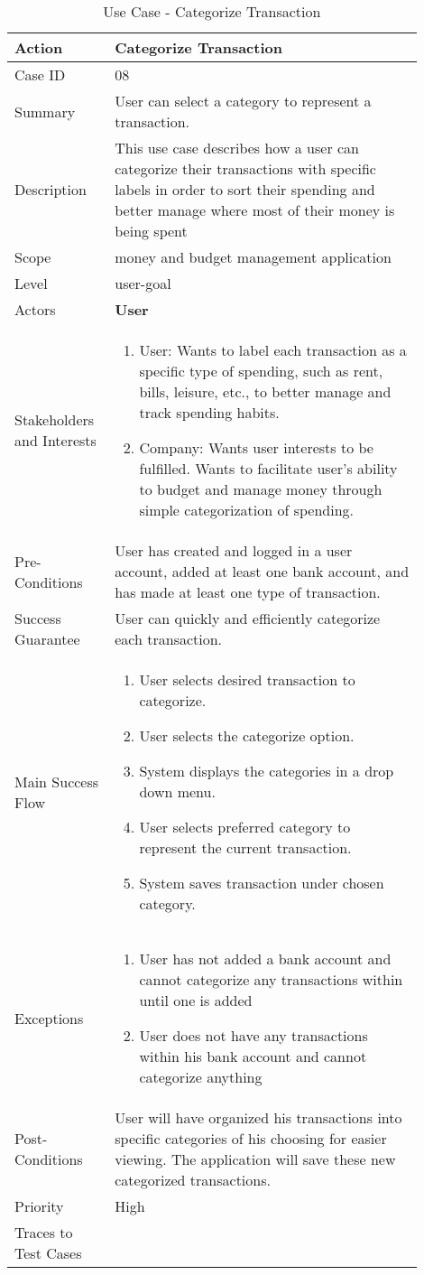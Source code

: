 \documentclass[11pt]{article}
\newcounter{use case ID}
\newcommand\tabularhead[1]{
    \begin{table}[ht]
        \addtocounter{use case ID}{1}
        \caption{Use Case \arabic{use case ID} - #1}
        \vspace{0.2cm}
        \begin{tabular}{|p{0.2\linewidth}|p{0.70\linewidth}|}
            \hline
            \textbf{Action} & \textbf{#1} \\
            \hline}
\newcommand\addrow[2]{#1 & #2\\ \hline}
\newcommand\addmulrow[2]{ \begin{minipage}[t][][t]{2.5cm}#1\end{minipage}
                &\begin{minipage}[t][][t]{11cm}
                    \begin{enumerate}[itemsep=-1ex] #2   \end{enumerate}
                \end{minipage}\vfill\\ \hline}
\newenvironment{usecase}{\tabularhead}
        {\hline\end{tabular}\end{table}}
\begin{document}
\begin{usecase}{Categorize Transaction}
    \addrow{Case ID}{08}
    \addrow{Summary}{User can select a category to represent a transaction.}
    \addrow{Description} {This use case describes how a user can categorize their transactions with specific labels in order to sort their spending and better manage where most of their money is being spent }
     \addrow{Scope}{money and budget management application}
     \addrow{Level}{user-goal}
     \addrow{Actors}{\textbf{User}}
     \addmulrow{Stakeholders and Interests}{
     \item User: Wants to label each transaction as a specific type of spending, such as rent, bills, leisure, etc., to better manage and track spending habits.
     \item Company: Wants user interests to be fulfilled. Wants to facilitate user's ability to budget and manage money through simple categorization of spending.}
     \addrow{Pre-Conditions}{User has created and logged in a user account, added at least one bank account, and has made at least one type of transaction.}
     \addrow{Success Guarantee}{User can quickly and efficiently categorize each transaction.}
     \addmulrow{Main Success Flow}{
     \item User selects desired transaction to categorize.
     \item User selects the categorize option.
     \item System displays the categories in a drop down menu.
     \item User selects preferred category to represent the current transaction.
     \item System saves transaction under chosen category.}
     \addmulrow{Exceptions} {
     \item User has not added a bank account and cannot categorize any transactions within until one is added \item User does not have any transactions within his bank account and cannot categorize anything}
     \addrow{Post-Conditions}{User will have organized his transactions into specific categories of his choosing for easier viewing. The application will save these new categorized transactions.}
     \addrow{Priority}{High}
     \addrow{Traces to Test Cases}{}

\end{usecase}
\end{document}
